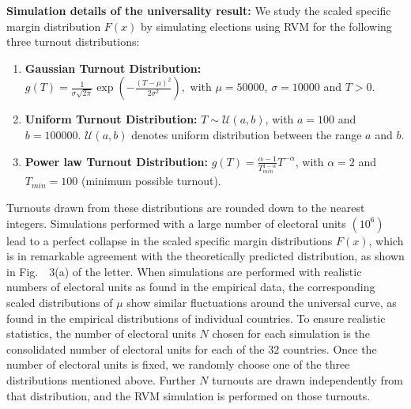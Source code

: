 \documentclass[reprint,aps,prl,showpacs,twocolumn, superscriptaddress]{revtex4-2}
\begin{document}
\vspace{1em}
\noindent \textbf{Simulation details of the universality result:} We study the scaled specific margin distribution $F(x)$ by simulating elections using RVM for the following three turnout distributions:
\begin{enumerate}
    \item \textbf{Gaussian Turnout Distribution:} $g(T) = \frac{1}{\sigma\sqrt{2\pi}}\exp\left(-\frac{(T - \mu)^2}{2\sigma^2}\right), \text{ with } \mu = 50000$, $\sigma = 10000$ and $T > 0$.
    \item \textbf{Uniform Turnout Distribution:} $T \sim \mathcal{U} (a, b)$, with $a = 100$ and $b = 100000$. $\mathcal{U}(a, b)$ denotes uniform distribution between the range $a$ and $b$.
        \item \textbf{Power law Turnout Distribution:} $g(T) = \frac{\alpha - 1}{T_{min} ^{1 -\alpha}} T ^ {-\alpha}$, with $\alpha = 2$ and $T_{min} = 100$ (minimum possible turnout).
\end{enumerate}
Turnouts drawn from these distributions are rounded down to the nearest integers. Simulations performed with a large number of electoral units $(10^6)$ lead to a perfect collapse in the scaled specific margin distributions $F(x)$, which is in remarkable agreement with the theoretically predicted distribution, as shown in Fig.~~3(a) of the letter. When simulations are performed with realistic numbers of electoral units as found in the empirical data, the corresponding scaled distributions of $\mu$ show similar fluctuations around the universal curve, as found in the empirical distributions of individual countries. To ensure realistic statistics, the number of electoral units $N$ chosen for each simulation is the consolidated number of electoral units for each of the $32$ countries. Once the number of electoral units is fixed, we randomly choose one of the three distributions mentioned above. Further $N$ turnouts are drawn independently from that distribution, and the RVM simulation is performed on those turnouts.

\newpage
\end{document}
